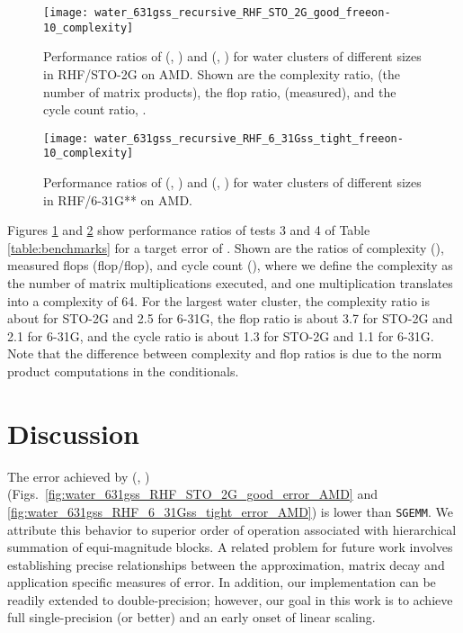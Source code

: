 \begin{figure}
\texttt{[image: water\_631gss\_recursive\_RHF\_STO\_2G\_good\_freeon-10\_complexity]}
\caption{\label{fig:water_STO2G_AMD_complexity} Performance ratios of
\SpAMM{}(, ) and \SpAMM{}(, ) for water clusters of different sizes in
RHF/STO-2G on AMD. Shown are the complexity ratio,  (the number
of  matrix products), the flop ratio, 
(measured), and the cycle count ratio, .}
\end{figure}

\begin{figure}
\texttt{[image: water\_631gss\_recursive\_RHF\_6\_31Gss\_tight\_freeon-10\_complexity]}
\caption{\label{fig:water_631gss_AMD_complexity} Performance ratios of
\SpAMM{}(, ) and \SpAMM{}(, ) for water clusters of different sizes in RHF/6-31G** on
AMD.}
\end{figure}

Figures \ref{fig:water_STO2G_AMD_complexity} and
\ref{fig:water_631gss_AMD_complexity} show performance ratios of tests 3 and 4
of Table \ref{table:benchmarks} for a target error of . Shown are the
ratios of complexity (), measured flops
(flop/flop), and cycle count (), where we
define the complexity as the number of  matrix
multiplications executed, and one  multiplication
translates into a complexity of 64. For the largest water cluster, the
complexity ratio is about  for STO-2G and 2.5 for 6-31G, the
flop ratio is about 3.7 for STO-2G and 2.1 for 6-31G, and the cycle
ratio is about 1.3 for STO-2G and 1.1 for 6-31G. Note that the
difference between complexity and flop ratios is due to the norm product
computations in the conditionals.

\section{Discussion}
\label{sec:discussion}

The error achieved by \SpAMM{}(, )
(Figs.~\ref{fig:water_631gss_RHF_STO_2G_good_error_AMD} and
\ref{fig:water_631gss_RHF_6_31Gss_tight_error_AMD}) is lower than {\tt SGEMM}.
We attribute this behavior to superior order of operation associated with
hierarchical summation of equi-magnitude blocks. A related problem for future
work involves establishing precise relationships between the \SpAMM{}
approximation, matrix decay and application specific measures of error.  In
addition, our implementation can be readily extended to double-precision;
however, our goal in this work is to achieve full single-precision (or better)
and an early onset of linear scaling.

